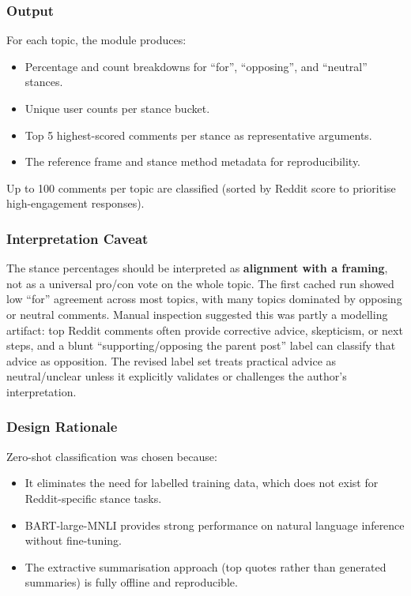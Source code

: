 \documentclass[11pt,a4paper]{article}
\begin{document}
\subsubsection{Output}

For each topic, the module produces:
\begin{itemize}[leftmargin=*]
  \item Percentage and count breakdowns for ``for'', ``opposing'', and ``neutral'' stances.
  \item Unique user counts per stance bucket.
  \item Top 5 highest-scored comments per stance as representative arguments.
  \item The reference frame and stance method metadata for reproducibility.
\end{itemize}

Up to 100 comments per topic are classified (sorted by Reddit score to prioritise high-engagement responses).

\subsubsection{Interpretation Caveat}

The stance percentages should be interpreted as \textbf{alignment with a framing}, not as a universal pro/con vote on the whole topic. The first cached run showed low ``for'' agreement across most topics, with many topics dominated by opposing or neutral comments. Manual inspection suggested this was partly a modelling artifact: top Reddit comments often provide corrective advice, skepticism, or next steps, and a blunt ``supporting/opposing the parent post'' label can classify that advice as opposition. The revised label set treats practical advice as neutral/unclear unless it explicitly validates or challenges the author's interpretation.


\subsubsection{Design Rationale}

Zero-shot classification was chosen because:
\begin{itemize}[leftmargin=*]
  \item It eliminates the need for labelled training data, which does not exist for Reddit-specific stance tasks.
  \item BART-large-MNLI provides strong performance on natural language inference without fine-tuning.
  \item The extractive summarisation approach (top quotes rather than generated summaries) is fully offline and reproducible.
\end{itemize}
\end{document}

